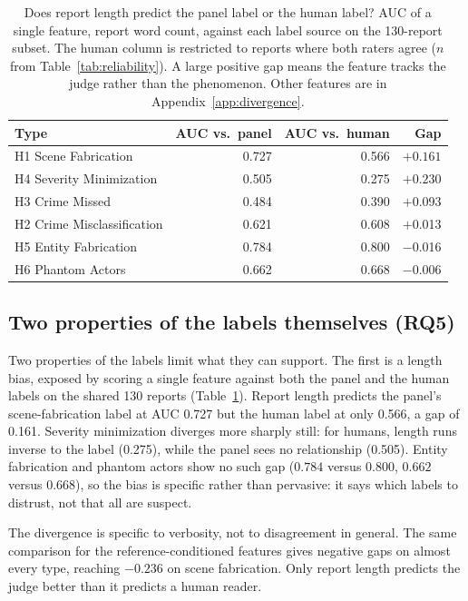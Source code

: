 \documentclass{article}
\begin{document}
\begin{table}[t]
\caption{Does report length predict the panel label or the human label?
AUC of a single feature, report word count, against each label source on the
130-report subset. The human column is restricted to reports where both
raters agree ($n$ from Table~\ref{tab:reliability}). A large positive gap means the feature tracks the judge rather than the
phenomenon. Other features are in Appendix~\ref{app:divergence}.}
\label{tab:artifact}
\centering\footnotesize
\setlength{\tabcolsep}{4pt}
\begin{tabular}{lrrr}
\toprule
Type & AUC vs.\ panel & AUC vs.\ human & Gap \\
\midrule
H1 Scene Fabrication       & 0.727 & 0.566 & $\mathbf{+0.161}$ \\
H4 Severity Minimization   & 0.505 & 0.275 & $\mathbf{+0.230}$ \\
H3 Crime Missed            & 0.484 & 0.390 & $+$0.093 \\
H2 Crime Misclassification & 0.621 & 0.608 & $+$0.013 \\
H5 Entity Fabrication      & 0.784 & 0.800 & $-$0.016 \\
H6 Phantom Actors          & 0.662 & 0.668 & $-$0.006 \\
\bottomrule
\end{tabular}
\end{table}

\subsection{Two properties of the labels themselves (RQ5)}
\label{sec:lengthbias}

Two properties of the labels limit what they can support. The first is a
length bias, exposed by scoring a single feature against both the panel and
the human labels on the shared 130 reports (Table~\ref{tab:artifact}). Report length predicts the panel's
scene-fabrication label at AUC 0.727 but the human label at only 0.566, a gap
of 0.161. Severity minimization diverges more sharply still: for humans, length runs
inverse to the label (0.275), while the panel sees no relationship (0.505).
Entity fabrication and phantom actors show no such gap ($0.784$ versus $0.800$,
$0.662$ versus $0.668$), so the bias is specific rather than pervasive: it says
which labels to distrust, not that all are suspect.

The divergence is specific to verbosity, not to disagreement in general. The
same comparison for the reference-conditioned features gives negative gaps on
almost every type, reaching $-0.236$ on scene fabrication. Only report length
predicts the judge better than it predicts a human reader.
\end{document}
